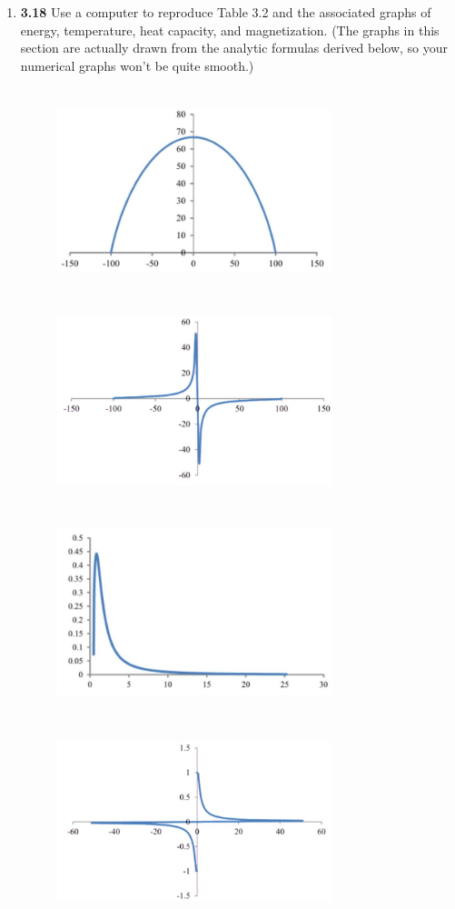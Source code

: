 \documentclass[fleqn]{article}
\begin{document}
\begin{enumerate}
    \pagebreak

    \item \textbf{3.18} Use a computer to reproduce Table 3.2 and the associated graphs of energy, temperature,
    heat capacity, and magnetization. (The graphs in this section are actually drawn from the analytic formulas
    derived below, so your numerical graphs won't be quite smooth.)

    \begin{figure}[h]
      \includegraphics[height=6cm, width=8cm]{7.JPG}
      \includegraphics[height=6cm, width=8cm]{8.JPG}
      \includegraphics[height=6cm, width=8cm]{9.JPG}
      \includegraphics[height=6cm, width=8cm]{10.JPG}
    \end{figure}

  \end{enumerate}
\end{document}
